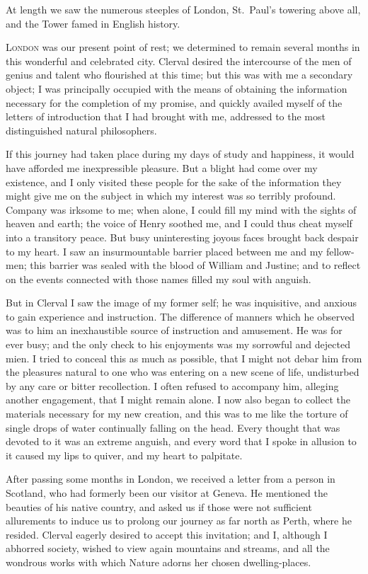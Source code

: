 At length we saw the numerous
steeples of London, St.~Paul's towering
above all, and the Tower famed in
English history.


\textsc{London} was our present point of rest;
we determined to remain several months
in this wonderful and celebrated city.
Clerval desired the intercourse of the
men of genius and talent who flourished
at this time; but this was with
me a secondary object; I was principally
occupied with the means of obtaining
the information necessary for
the completion of my promise, and
quickly availed myself of the letters of
introduction that I had brought with
me, addressed to the most distinguished
natural philosophers.

If this journey had taken place during
my days of study and happiness, it would
have afforded me inexpressible pleasure.
But a blight had come over my existence,
and I only visited these people for
the sake of the information they might
give me on the subject in which my
interest was so terribly profound. Company
was irksome to me; when alone,
I could fill my mind with the sights of
heaven and earth; the voice of Henry
soothed me, and I could thus cheat myself
into a transitory peace. But busy
uninteresting joyous faces brought back
despair to my heart. I saw an insurmountable
barrier placed between me
and my fellow-men; this barrier was
sealed with the blood of William and
Justine; and to reflect on the events
connected with those names filled my
soul with anguish.

But in Clerval I saw the image of my
former self; he was inquisitive, and anxious
to gain experience and instruction.
The difference of manners which
he observed was to him an inexhaustible
source of instruction and
amusement. He was for ever busy; and
the only check to his enjoyments was
my sorrowful and dejected mien. I
tried to conceal this as much as possible,
that I might not debar him from
the pleasures natural to one who was
entering on a new scene of life, undisturbed
by any care or bitter recollection.
I often refused to accompany
him, alleging another engagement, that
I might remain alone. I now also began
to collect the materials necessary
for my new creation, and this was to
me like the torture of single drops of
water continually falling on the head.
Every thought that was devoted to it
was an extreme anguish, and every
word that I spoke in allusion to it
caused my lips to quiver, and my heart
to palpitate.

After passing some months in London,
we received a letter from a person
in Scotland, who had formerly been
our visitor at Geneva. He mentioned
the beauties of his native country, and
asked us if those were not sufficient
allurements to induce us to prolong
our journey as far north as Perth, where
he resided. Clerval eagerly desired to
accept this invitation; and I, although
I abhorred society, wished to view
again mountains and streams, and all
the wondrous works with which Nature
adorns her chosen dwelling-places.

